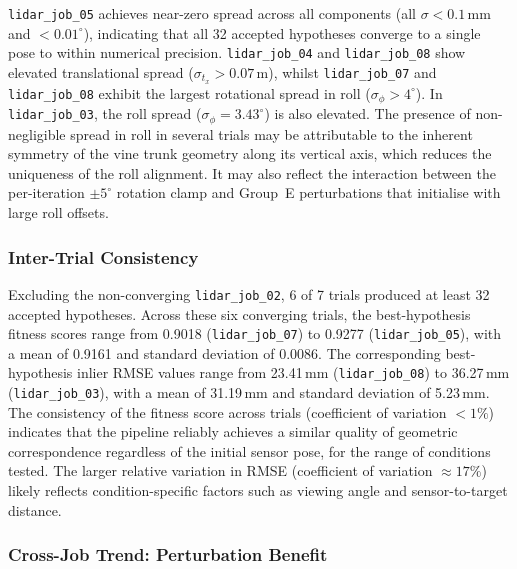 \texttt{lidar\_job\_05} achieves near-zero spread across all components (all $\sigma < 0.1$\,mm and $< 0.01^{\circ}$), indicating that all 32 accepted hypotheses converge to a single pose to within numerical precision. \texttt{lidar\_job\_04} and \texttt{lidar\_job\_08} show elevated translational spread ($\sigma_{t_x} > 0.07$\,m), whilst \texttt{lidar\_job\_07} and \texttt{lidar\_job\_08} exhibit the largest rotational spread in roll ($\sigma_\phi > 4^{\circ}$). In \texttt{lidar\_job\_03}, the roll spread ($\sigma_\phi = 3.43^{\circ}$) is also elevated. The presence of non-negligible spread in roll in several trials may be attributable to the inherent symmetry of the vine trunk geometry along its vertical axis, which reduces the uniqueness of the roll alignment. It may also reflect the interaction between the per-iteration $\pm 5^{\circ}$ rotation clamp and Group~E perturbations that initialise with large roll offsets.

\subsubsection*{Inter-Trial Consistency}

Excluding the non-converging \texttt{lidar\_job\_02}, 6 of 7 trials produced at least 32 accepted hypotheses. Across these six converging trials, the best-hypothesis fitness scores range from 0.9018 (\texttt{lidar\_job\_07}) to 0.9277 (\texttt{lidar\_job\_05}), with a mean of 0.9161 and standard deviation of 0.0086. The corresponding best-hypothesis inlier RMSE values range from 23.41\,mm (\texttt{lidar\_job\_08}) to 36.27\,mm (\texttt{lidar\_job\_03}), with a mean of 31.19\,mm and standard deviation of 5.23\,mm. The consistency of the fitness score across trials (coefficient of variation $< 1\%$) indicates that the pipeline reliably achieves a similar quality of geometric correspondence regardless of the initial sensor pose, for the range of conditions tested. The larger relative variation in RMSE (coefficient of variation $\approx 17\%$) likely reflects condition-specific factors such as viewing angle and sensor-to-target distance.

\subsubsection*{Cross-Job Trend: Perturbation Benefit}

